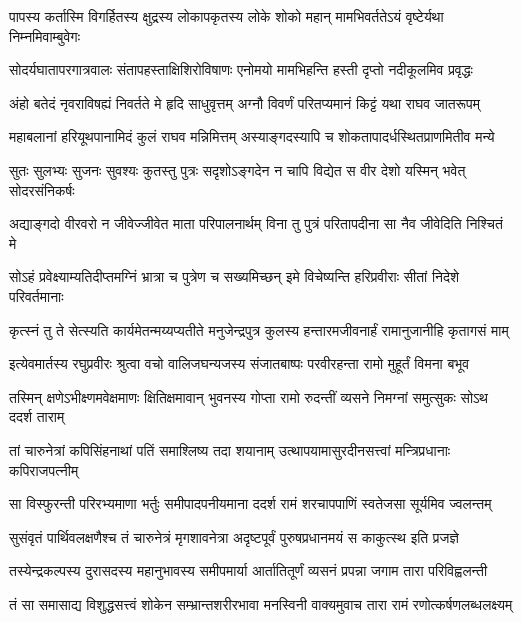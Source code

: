 \twolineshloka
{पापस्य कर्तास्मि विगर्हितस्य क्षुद्रस्य लोकापकृतस्य लोके}
{शोको महान् मामभिवर्ततेऽयं वृष्टेर्यथा निम्नमिवाम्बुवेगः} %

\twolineshloka
{सोदर्यघातापरगात्रवालः संतापहस्ताक्षिशिरोविषाणः}
{एनोमयो मामभिहन्ति हस्ती दृप्तो नदीकूलमिव प्रवृद्धः} %

\twolineshloka
{अंहो बतेदं नृवराविषह्यं निवर्तते मे हृदि साधुवृत्तम्}
{अग्नौ विवर्णं परितप्यमानं किट्टं यथा राघव जातरूपम्} %

\twolineshloka
{महाबलानां हरियूथपानामिदं कुलं राघव मन्निमित्तम्}
{अस्याङ्गदस्यापि च शोकतापादर्धस्थितप्राणमितीव मन्ये} %

\twolineshloka
{सुतः सुलभ्यः सुजनः सुवश्यः कुतस्तु पुत्रः सदृशोऽङ्गदेन}
{न चापि विद्येत स वीर देशो यस्मिन् भवेत् सोदरसंनिकर्षः} %

\twolineshloka
{अद्याङ्गदो वीरवरो न जीवेज्जीवेत माता परिपालनार्थम्}
{विना तु पुत्रं परितापदीना सा नैव जीवेदिति निश्चितं मे} %

\twolineshloka
{सोऽहं प्रवेक्ष्याम्यतिदीप्तमग्निं भ्रात्रा च पुत्रेण च सख्यमिच्छन्}
{इमे विचेष्यन्ति हरिप्रवीराः सीतां निदेशे परिवर्तमानाः} %

\twolineshloka
{कृत्स्नं तु ते सेत्स्यति कार्यमेतन्मय्यप्यतीते मनुजेन्द्रपुत्र}
{कुलस्य हन्तारमजीवनार्हं रामानुजानीहि कृतागसं माम्} %

\twolineshloka
{इत्येवमार्तस्य रघुप्रवीरः श्रुत्वा वचो वालिजघन्यजस्य}
{संजातबाष्पः परवीरहन्ता रामो मुहूर्तं विमना बभूव} %

\twolineshloka
{तस्मिन् क्षणेऽभीक्ष्णमवेक्षमाणः क्षितिक्षमावान् भुवनस्य गोप्ता}
{रामो रुदन्तीं व्यसने निमग्नां समुत्सुकः सोऽथ ददर्श ताराम्} %

\twolineshloka
{तां चारुनेत्रां कपिसिंहनाथां पतिं समाश्लिष्य तदा शयानाम्}
{उत्थापयामासुरदीनसत्त्वां मन्त्रिप्रधानाः कपिराजपत्नीम्} %

\twolineshloka
{सा विस्फुरन्ती परिरभ्यमाणा भर्तुः समीपादपनीयमाना}
{ददर्श रामं शरचापपाणिं स्वतेजसा सूर्यमिव ज्वलन्तम्} %

\twolineshloka
{सुसंवृतं पार्थिवलक्षणैश्च तं चारुनेत्रं मृगशावनेत्रा}
{अदृष्टपूर्वं पुरुषप्रधानमयं स काकुत्स्थ इति प्रजज्ञे} %

\twolineshloka
{तस्येन्द्रकल्पस्य दुरासदस्य महानुभावस्य समीपमार्या}
{आर्तातितूर्णं व्यसनं प्रपन्ना जगाम तारा परिविह्वलन्ती} %

\twolineshloka
{तं सा समासाद्य विशुद्धसत्त्वं शोकेन सम्भ्रान्तशरीरभावा}
{मनस्विनी वाक्यमुवाच तारा रामं रणोत्कर्षणलब्धलक्ष्यम्} %

